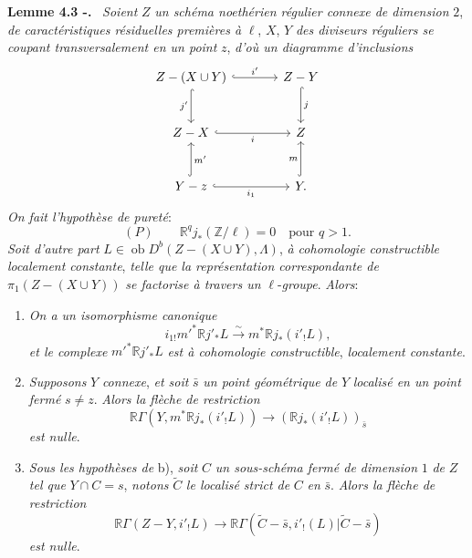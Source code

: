 \documentclass[11pt]{article}
\newenvironment{statement}[1]{\par\medskip\noindent\textbf{#1.}\ }{\par\medskip}
\newcommand{\R}{\mathbb{R}}\newcommand{\RHomCore}{\mathbb{R}\mathrm{Hom}}
\providecommand{\Ob}{\operatorname{ob}}
\providecommand{\Ob}{\operatorname{ob}}
\providecommand{\R}{\mathrm R}
\providecommand{\Ob}{\operatorname{Ob}}
\providecommand{\Ob}{\operatorname{ob}}
\providecommand{\Ob}{\operatorname{Ob}}
\begin{document}
\begin{statement}{Lemme 4.3 -}
\emph{Soient} $Z$ \emph{un schéma noethérien régulier connexe de dimension} $2$, \emph{de caractéristiques résiduelles premières à} $\ell$, $X$, $Y$ \emph{des diviseurs réguliers se coupant transversalement en un point} $z$, \emph{d'où un diagramme d'inclusions}
\[
\begin{tikzcd}[column sep=large,row sep=large]
Z-(X\cup Y) \arrow[r,hook,"i'"] \arrow[d,hook,"j'"'] & Z-Y \arrow[d,hook,"j"]\\
Z-X \arrow[r,hook,"i"'] & Z\\
Y-z \arrow[r,hook,"i_1"'] \arrow[u,hook,"m'"'] & Y \arrow[u,hook,"m"] .
\end{tikzcd}
\]
\emph{On fait l'hypothèse de pureté}:
\[
(P)\qquad \R^qj_*(\mathbb Z/\ell)=0\quad\text{pour }q>1.
\]
\emph{Soit d'autre part} $L\in\Ob D^b(Z-(X\cup Y),\Lambda)$, \emph{à cohomologie constructible localement constante}, \emph{telle que la représentation correspondante de} $\pi_1(Z-(X\cup Y))$ \emph{se factorise à travers un} $\ell$-\emph{groupe}. \emph{Alors}:
\begin{enumerate}[label=\alph*)]
\item \emph{On a un isomorphisme canonique}
\[
i_{1!}m'^*\R j'_*L\xrightarrow{\sim} m^*\R j_*(i'_!L),
\]
\emph{et le complexe} $m'^*\R j'_*L$ \emph{est à cohomologie constructible}, \emph{localement constante}.
\item \emph{Supposons} $Y$ \emph{connexe}, \emph{et soit} $\bar s$ \emph{un point géométrique de} $Y$ \emph{localisé en un point fermé} $s\ne z$. \emph{Alors la flèche de restriction}
\begin{equation}
\R\Gamma(Y,m^*\R j_*(i'_!L))\longrightarrow (\R j_*(i'_!L))_{\bar s}
\tag{4.3.1}
\end{equation}
\emph{est nulle}.
\item \emph{Sous les hypothèses de} b), \emph{soit} $C$ \emph{un sous-schéma fermé de dimension} $1$ \emph{de} $Z$ \emph{tel que} $Y\cap C=s$, \emph{notons} $\widetilde C$ \emph{le localisé strict de} $C$ \emph{en} $\bar s$. \emph{Alors la flèche de restriction}
\begin{equation}
\R\Gamma(Z-Y,i'_!L)
\longrightarrow
\R\Gamma(\widetilde C-\bar s,i'_!(L)|\widetilde C-\bar s)
\tag{4.3.2}
\end{equation}
\emph{est nulle}.
\end{enumerate}
\end{statement}
\end{document}
